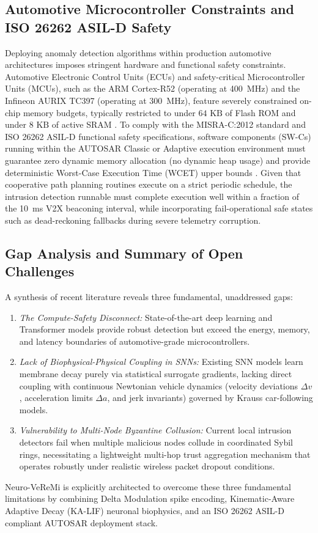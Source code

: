 \documentclass[journal]{IEEEtran}
\begin{document}
\subsection{Automotive Microcontroller Constraints and ISO 26262 ASIL-D Safety}
Deploying anomaly detection algorithms within production automotive architectures imposes stringent hardware and functional safety constraints. Automotive Electronic Control Units (ECUs) and safety-critical Microcontroller Units (MCUs), such as the ARM Cortex-R52 (operating at 400~MHz) and the Infineon AURIX TC397 (operating at 300~MHz), feature severely constrained on-chip memory budgets, typically restricted to under $64\text{ KB}$ of Flash ROM and under $8\text{ KB}$ of active SRAM \cite{dey2025secure, misra2012}. To comply with the MISRA-C:2012 standard and ISO 26262 ASIL-D functional safety specifications, software components (SW-Cs) running within the AUTOSAR Classic or Adaptive execution environment must guarantee zero dynamic memory allocation (no dynamic heap usage) and provide deterministic Worst-Case Execution Time (WCET) upper bounds \cite{wilhelm2008worst, iso26262}. Given that cooperative path planning routines execute on a strict periodic schedule, the intrusion detection runnable must complete execution well within a fraction of the 10~ms V2X beaconing interval, while incorporating fail-operational safe states such as dead-reckoning fallbacks during severe telemetry corruption.

\subsection{Gap Analysis and Summary of Open Challenges}
A synthesis of recent literature reveals three fundamental, unaddressed gaps:
\begin{enumerate}
    \item \textit{The Compute-Safety Disconnect:} State-of-the-art deep learning and Transformer models provide robust detection but exceed the energy, memory, and latency boundaries of automotive-grade microcontrollers.
    \item \textit{Lack of Biophysical-Physical Coupling in SNNs:} Existing SNN models learn membrane decay purely via statistical surrogate gradients, lacking direct coupling with continuous Newtonian vehicle dynamics (velocity deviations $\Delta v$, acceleration limits $\Delta a$, and jerk invariants) governed by Krauss car-following models.
    \item \textit{Vulnerability to Multi-Node Byzantine Collusion:} Current local intrusion detectors fail when multiple malicious nodes collude in coordinated Sybil rings, necessitating a lightweight multi-hop trust aggregation mechanism that operates robustly under realistic wireless packet dropout conditions.
\end{enumerate}
Neuro-VeReMi is explicitly architected to overcome these three fundamental limitations by combining Delta Modulation spike encoding, Kinematic-Aware Adaptive Decay (KA-LIF) neuronal biophysics, and an ISO 26262 ASIL-D compliant AUTOSAR deployment stack.
\end{document}
